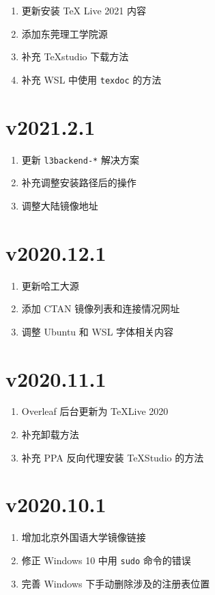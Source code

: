 \begin{enumerate}
  \item 更新安装 \TeX{} Live 2021 内容
  \item 添加东莞理工学院源
  \item 补充 \TeX studio 下载方法
  \item 补充 WSL 中使用 \texttt{texdoc} 的方法
\end{enumerate}

\section*{v2021.2.1}

\begin{enumerate}
  \item 更新 \texttt{l3backend-*} 解决方案
  \item 补充调整安装路径后的操作
  \item 调整大陆镜像地址
\end{enumerate}
\section*{v2020.12.1}

\begin{enumerate}
  \item 更新哈工大源
  \item 添加 CTAN 镜像列表和连接情况网址
  \item 调整 Ubuntu 和 WSL 字体相关内容
\end{enumerate}

\section*{v2020.11.1}

\begin{enumerate}
  \item Overleaf 后台更新为 \TeX Live 2020
  \item 补充卸载方法
  \item 补充 PPA 反向代理安装 \TeX Studio 的方法
\end{enumerate}

\section*{v2020.10.1}

\begin{enumerate}
  \item 增加北京外国语大学镜像链接
  \item 修正 Windows 10 中用 \texttt{sudo} 命令的错误
  \item 完善 Windows 下手动删除涉及的注册表位置
\end{enumerate}

